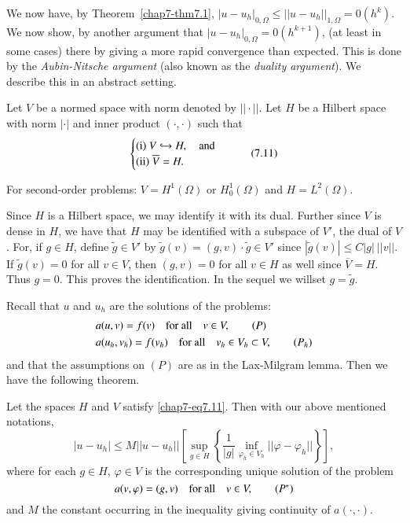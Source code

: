 We now have, by Theorem~\ref{chap7-thm7.1}, $|u-u_{h}|_{0,\Omega}\leq
||u-u_{h}||_{1,\Omega}=0(h^{k})$. We now show, by another argument
that $|u-u_{h}|_{0,\Omega}=0(h^{k+1})$, (at least in some cases) there
by giving a more rapid convergence than expected. This is done by the
{\em Aubin-Nitsche argument} (also known as the {\em duality
  argument}). We describe this in an abstract setting.

Let $V$ be a normed space with norm denoted by $||\cdot||$. Let $H$ be
a Hilbert space with norm $|\cdot|$ and inner product $(\cdot,\cdot)$
such that
\begin{equation*}
\begin{cases}
{\rm(i)}~ V\hookrightarrow H,\quad\text{and}\\
{\rm(ii)}~ \overline{V}=H.
\end{cases}\tag{7.11}\label{chap7-eq7.11}
\end{equation*}

For second-order problems: $V=H^{1}(\Omega)$ or $H^{1}_{0}(\Omega)$
and $H=L^{2}(\Omega)$.

Since $H$ is a Hilbert space, we may identify it with its
dual. Further since $V$ is dense in $H$, we have that $H$ may be
identified with a subspace of $V'$, the dual of $V$. For, if $g\in H$,
define $\tilde{g}\in V'$ by $\tilde{g}(v)=(g,v)\cdot \tilde{g}\in V'$
since $|\tilde{g}(v)|\leq C|g|~||v||$. If $\tilde{g}(v)=0$ for all
$v\in V$, then $(g,v)=0$ for all $v\in H$ as well since
$\overline{V}=H$. Thus $g=0$. This proves the identification. In the
sequel we will\pageoriginale set $g=\tilde{g}$.

Recall that $u$ and $u_{h}$ are the solutions of the problems:
\begin{align*}
& a(u,v)=f(v)\quad\text{for all}\quad v\in V,\tag{$P$}\\
& a(u_{h},v_{h})=f(v_{h})\quad\text{for all}\quad v_{h}\in
  V_{h}\subset V,\tag{$P_{h}$}
\end{align*}
and that the assumptions on $(P)$ are as in the Lax-Milgram
lemma. Then we have the following theorem.

\begin{theorem}\label{chap7-thm7.3}
Let the spaces $H$ and $V$ satisfy \eqref{chap7-eq7.11}. Then with our
above mentioned notations,
\begin{equation*}
|u-u_{h}|\leq M||u-u_{h}||\left[\sup\limits_{g\in
    H}\left\{\frac{1}{|g|}\inf\limits_{\varphi_{h}\in
    V_{h}}||\varphi-\varphi_{h}||\right\}\right],\tag{7.12}\label{chap7-eq7.12} 
\end{equation*}
where for each $g\in H$, $\varphi\in V$ is the corresponding unique
solution of the problem 
\begin{equation*}
a(v,\varphi)=(g,v)\quad\text{for all}\quad v\in V,\tag{$P^{*}$}
\end{equation*}
and $M$ the constant occurring in the inequality giving continuity of
$a(\cdot,\cdot)$. 
\end{theorem}

